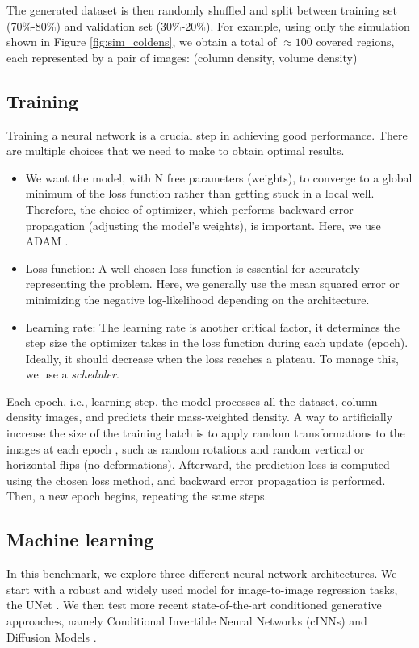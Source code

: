 \documentclass{aa}
\begin{document}
   The generated dataset is then randomly shuffled and split between training set (70\%-80\%) and validation set (30\%-20\%). 
   For example, using only the simulation shown in Figure \ref{fig:sim_coldens}, 
   we obtain a total of $\approx100$ covered regions, each represented by a pair of images: (column density, volume density)

\subsection{Training}

   Training a neural network is a crucial step in achieving good performance.
   There are multiple choices that we need to make to obtain optimal results.
   \begin{itemize}
      \item We want the model, with N free parameters (weights), to
      converge to a global minimum of the loss function rather
      than getting stuck in a local well. Therefore, the choice
      of optimizer, which performs backward error propagation
      (adjusting the model's weights), is important. Here, we
      use ADAM \citep{kingmaAdamMethodStochastic2017}.
      \item Loss function: A well-chosen loss function is essential for
      accurately representing the problem. Here, we generally
      use the mean squared error or minimizing the negative log-likelihood depending on the architecture.
      \item Learning rate: The learning rate is another critical
      factor, it determines the step size the optimizer takes
      in the loss function during each update (epoch). Ideally, it should decrease when the loss reaches a plateau. To
      manage this, we use a \textit{scheduler}.
   \end{itemize}

   Each epoch, i.e., learning step, the model processes all the dataset, column density images, and predicts their mass-weighted density.
   A way to artificially increase the size of the training batch is to apply random transformations to the images at each epoch
   \citep{yangImageDataAugmentation2023}, such as random rotations and random vertical or horizontal flips (no deformations). 
   Afterward, the prediction loss is computed using the chosen loss method, and backward error propagation is performed. Then, a new epoch begins, repeating the same steps.

\subsection{Machine learning}
   In this benchmark, we explore three different neural network architectures.
   We start with a robust and widely used model for image-to-image regression tasks, the UNet \citep{ronnebergerUNetConvolutionalNetworks2015,oktayAttentionUNetLearning2018}.
   We then test more recent state-of-the-art conditioned generative approaches, namely Conditional Invertible Neural Networks (cINNs) \citep{ardizzoneConditionalInvertibleNeural2021} and Diffusion Models \citep{hoDenoisingDiffusionProbabilistic2020}.   
   
\end{document}
